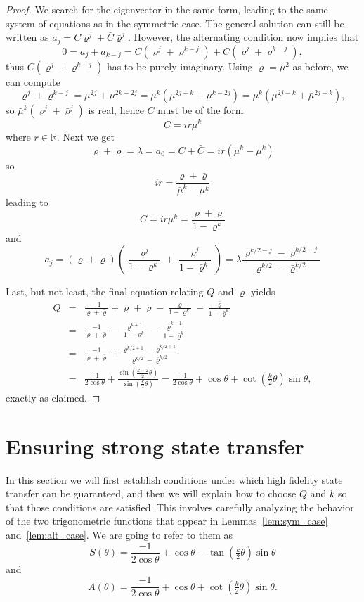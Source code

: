 \documentclass{article}
\theoremstyle{definition}
\numberwithin{equation}{section}
\numberwithin{theorem}{section}
\newcommand{\ro}{\varrho}
\newcommand{\brho}{\bar{\varrho}}
\newcommand{\R}{\mathbb{R}}
\begin{document}
\begin{proof}
    We search for the eigenvector in the same form, leading to the same system of equations as in the symmetric case. The general solution can still be written as $a_j = C \ro^j + \bar{C}\brho^j$. However, the alternating condition now implies that 
    \[ 0 = a_j + a_{k-j} = C(\ro^j+\ro^{k-j}) + \bar{C}(\brho^j + \brho^{k-j}), \] thus 
    $C(\ro^j + \ro^{k-j})$ has to be purely imaginary. Using $\ro = \mu^2$ as before, we can compute \[\ro^j + \ro^{k-j} = \mu^{2j}+\mu^{2k-2j} = \mu^k (\mu^{2j-k} + \mu^{k-2j}) = \mu^k(\mu^{2j-k}+\bar{\mu}^{2j-k}),\] so $\bar{\mu}^k (\ro^j+\brho^j)$ is real, hence $C$ must be of the form 
    \[ C = i r \bar{\mu}^k\] where $r \in \R$. Next we get 
    \[ \ro+\brho = \lambda = a_0 = C + \bar{C} = ir(\bar{\mu}^k-\mu^k)\] so
    \[ir = \frac{\ro+\brho}{\bar{\mu}^k-\mu^k} \] leading to 
    \[ C = ir \bar{\mu}^k = \frac{\ro+\brho}{1-\ro^k}\] and 
    \[ a_j = (\ro+\brho) \left( \frac{\ro^j}{1-\ro^k} + \frac{\brho^j}{1-\brho^k}\right) = \lambda \frac{\ro^{k/2-j}-\brho^{k/2-j}}{\ro^{k/2}-\brho^{k/2}}\]

    Last, but not least, the final equation relating $Q$ and $\ro$ yields
\begin{eqnarray} \label{eq:q+1/lambda:alt}
    Q &=& \frac{-1}{\ro+\brho}+
 \ro+\brho
  - \frac{\ro}{1-\ro^k}
  - \frac{\brho}{1-\brho^k}\\&=&
     \frac{-1}{\ro+\brho}
- \frac{\ro^{k+1}}{1-\ro^k} - \frac{\brho^{k+1}}{1-\brho^k} \\
 &=& 
\frac{-1}{\ro+\brho} + \frac{\ro^{k/2+1}-\brho^{k/2+1}}{\ro^{k/2} - \brho^{k/2}}\\
&=& \frac{-1}{2\cos \theta} + \frac{\sin(\tfrac{k+2}{2} \theta)}{\sin(\tfrac{k}{2}\theta)} = \frac{-1}{2\cos\theta}+\cos \theta + \cot \left(\tfrac{k}{2}\theta\right)\sin \theta,
\end{eqnarray} exactly as claimed.
\end{proof}

\section{Ensuring strong state transfer} \label{sec:fidelity}

In this section we will first establish conditions under which high fidelity state transfer can be guaranteed, and then we will explain how to choose $Q$ and $k$ so that those conditions are satisfied. This involves carefully analyzing the behavior of the two trigonometric functions that appear in Lemmas~\ref{lem:sym_case} and~\ref{lem:alt_case}. We are going to refer to them as
\[ S(\theta) =  \frac{-1}{2\cos \theta}+\cos \theta - \tan \left(\tfrac{k}{2}\theta\right)\sin \theta\] and 
\[ A(\theta) = \frac{-1}{2\cos \theta}+\cos \theta + \cot \left(\tfrac{k}{2}\theta\right)\sin \theta.\]
\end{document}
